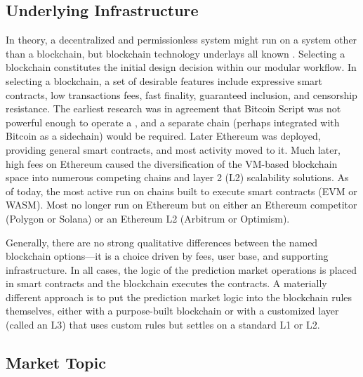 
\subsection{Underlying Infrastructure}
\label{subsec:blockchain_infra}\label{wf:chain}

In theory, a decentralized and permissionless system might run on a system other than a blockchain, but blockchain technology underlays all known \depms. Selecting a blockchain constitutes the initial design decision within our modular workflow. In selecting a blockchain, a set of desirable features include expressive smart contracts, low transactions fees, fast finality, guaranteed inclusion, and censorship resistance. The earliest research was in agreement that Bitcoin Script was not powerful enough to operate a \depm, and a separate chain (perhaps integrated with Bitcoin as a sidechain) would be required. Later Ethereum was deployed, providing general smart contracts, and most \depm activity moved to it. Much later, high fees on Ethereum caused the diversification of the VM-based blockchain space into numerous competing chains and layer 2 (L2) scalability solutions. As of today, the most active \depms run on chains built to execute smart contracts (\eg EVM or WASM). Most no longer run on Ethereum but on either an Ethereum competitor (\eg Polygon or Solana) or an Ethereum L2 (\eg Arbitrum or Optimism).

Generally, there are no strong qualitative differences between the named blockchain options---it is a choice driven by fees, user base, and supporting infrastructure. In all cases, the logic of the prediction market operations is placed in smart contracts and the blockchain executes the contracts. A materially different approach is  to put the prediction market logic into the blockchain rules themselves, either with a purpose-built blockchain or with a customized layer (called an L3) that uses custom rules but settles on a standard L1 or L2.




\subsection{Market Topic}\label{wf:topic}

